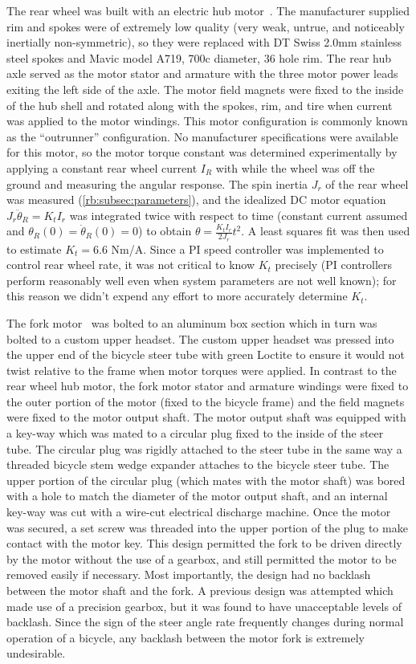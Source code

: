 The rear wheel was built with an electric hub motor~\cite{AmpedBikes}. The
manufacturer supplied rim and spokes were of extremely low quality (very weak,
untrue, and noticeably inertially non-symmetric), so they were replaced with DT
Swiss 2.0mm stainless steel spokes and Mavic model A719, 700c diameter, 36 hole
rim. The rear hub axle served as the motor stator and armature with the three
motor power leads exiting the left side of the axle. The motor field magnets
were fixed to the inside of the hub shell and rotated along with the spokes,
rim, and tire when current was applied to the motor windings. This motor
configuration is commonly known as the ``outrunner'' configuration. No
manufacturer specifications were available for this motor, so the motor torque
constant was determined experimentally by applying a constant rear wheel
current $I_R$ with while the wheel was off the ground and measuring the angular
response. The spin inertia $J_r$ of the rear wheel was measured
(\autoref{rb:subsec:parameters}), and the idealized DC motor equation
$J_r\ddot{\theta}_R = K_t I_r$ was integrated twice with respect to time
(constant current assumed and $\theta_R(0)=\dot{\theta}_R(0) = 0$) to obtain
$\theta = \frac{K_t I_r}{2J_r}t^2$. A least squares fit was then used to
estimate $K_t=6.6$ Nm/A. Since a PI speed controller was implemented to control
rear wheel rate, it was not critical to know $K_t$ precisely (PI controllers
perform reasonably well even when system parameters are not well known); for
this reason we didn't expend any effort to more accurately determine $K_t$.

The fork motor~\cite{TeknicM3441} was bolted to an aluminum box section which
in turn was bolted to a custom upper headset. The custom upper headset was
pressed into the upper end of the bicycle steer tube with green Loctite to
ensure it would not twist relative to the frame when motor torques were
applied. In contrast to the rear wheel hub motor, the fork motor stator and
armature windings were fixed to the outer portion of the motor (fixed to the
bicycle frame) and the field magnets were fixed to the motor output shaft.  The
motor output shaft was equipped with a key-way which was mated to a circular
plug fixed to the inside of the steer tube. The circular plug was rigidly
attached to the steer tube in the same way a threaded bicycle stem wedge
expander attaches to the bicycle steer tube. The upper portion of the circular
plug (which mates with the motor shaft) was bored with a hole to match the
diameter of the motor output shaft, and an internal key-way was cut with a
wire-cut electrical discharge machine. Once the motor was secured, a set
screw was threaded into the upper portion of the plug to make contact with the
motor key. This design permitted the fork to be driven directly by the motor
without the use of a gearbox, and still permitted the motor to be removed
easily if necessary. Most importantly, the design had no backlash between the
motor shaft and the fork. A previous design was attempted which made use of a
precision gearbox, but it was found to have unacceptable levels of backlash.
Since the sign of the steer angle rate frequently changes during normal
operation of a bicycle, any backlash between the motor fork is extremely
undesirable.

